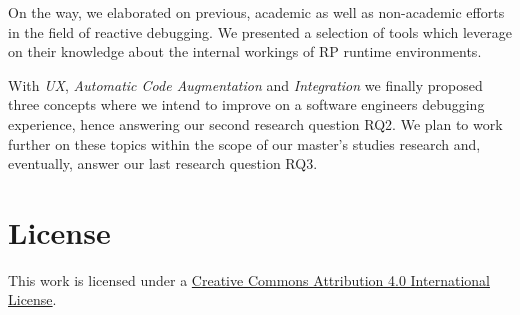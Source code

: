 \documentclass[12pt,a4paper]{article}
\begin{document}
On the way, we elaborated on previous, academic as well as non-academic efforts in the field of reactive debugging. We presented a selection of tools which leverage on their knowledge about the internal workings of RP runtime environments.

With \emph{UX}, \emph{Automatic Code Augmentation} and \emph{Integration} we finally proposed three concepts where we intend to improve on a software engineers debugging experience, hence answering our second research question RQ2. We plan to work further on these topics within the scope of our master's studies research and, eventually, answer our last research question RQ3.





\section*{License}
\ccby\thinspace\thinspace This work is licensed under a \href{https://creativecommons.org/licenses/by/4.0/}{Creative Commons Attribution 4.0 International License}.
\end{document}
